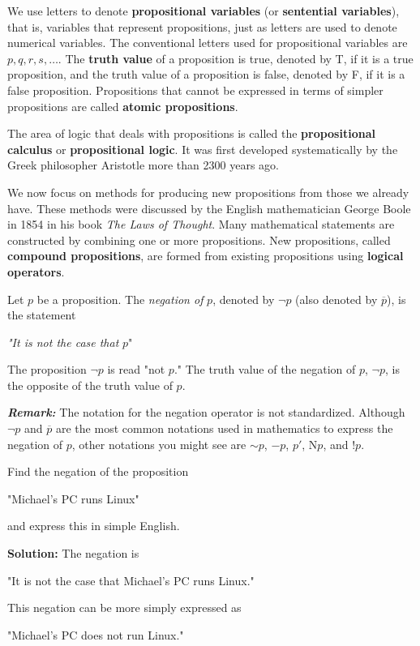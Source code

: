 \documentclass{Axon}
\begin{document}
We use letters to denote \textbf{propositional variables} (or \textbf{sentential variables}), that is, variables that represent propositions, just as letters are used to denote numerical variables. The conventional letters used for propositional variables are \(p, q, r, s, \ldots\). The \textbf{truth value} of a proposition is true, denoted by T, if it is a true proposition, and the truth value of a proposition is false, denoted by F, if it is a false proposition. Propositions that cannot be expressed in terms of simpler propositions are called \textbf{atomic propositions}.

The area of logic that deals with propositions is called the \textbf{propositional calculus} or \textbf{propositional logic}. It was first developed systematically by the Greek philosopher Aristotle more than 2300 years ago.

We now focus on methods for producing new propositions from those we already have. These methods were discussed by the English mathematician George Boole in 1854 in his book \textit{The Laws of Thought}. Many mathematical statements are constructed by combining one or more propositions. New propositions, called \textbf{compound propositions}, are formed from existing propositions using \textbf{logical operators}.

\begin{definition}
    Let \(p\) be a proposition. The \textit{negation of} \(p\), denoted by \(\lnot p\) (also denoted by \(\overline{p}\)), is the statement
    \begin{center}
        \textit{"It is not the case that} \(p\)"
    \end{center}
    The proposition \(\lnot p\) is read "not \(p\)." The truth value of the negation of \(p\), \(\lnot p\), is the opposite of the truth value of \(p\).
\end{definition}

\textbf{\textit{Remark:}} The notation for the negation operator is not standardized. Although \(\lnot p\) and \(\overline{p}\) are the most common notations used in mathematics to express the negation of \(p\), other notations you might see are \(\sim p\), \(-p\), \(p'\), N\(p\), and \(!p\).

\begin{example}
    Find the negation of the proposition
    \begin{center}
        "Michael's PC runs Linux"
    \end{center}
    and express this in simple English.

    \noindent
    \textbf{Solution:}
    The negation is
    \begin{center}
        "It is not the case that Michael's PC runs Linux."
    \end{center}
    This negation can be more simply expressed as
    \begin{center}
        "Michael's PC does not run Linux."
    \end{center}
\end{example}
\end{document}
